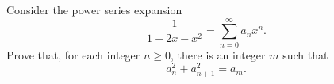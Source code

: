 Consider the power series expansion
\[\frac{1}{1-2x-x^2} = \sum_{n=0}^\infty a_n x^n.\]
Prove that, for each integer $n\geq 0$, there is an integer $m$ such that
\[a_n^2 + a_{n+1}^2 = a_m .\]
